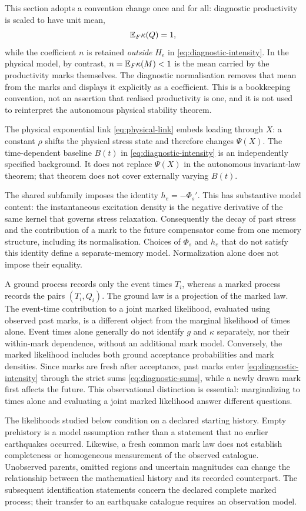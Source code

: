 This section adopts a convention change once and for all: diagnostic productivity is scaled to have unit mean,
\[
\mathbb{E} _F\kappa(Q)=1,
\]
while the coefficient \(n\) is retained \emph{outside} \(H_e\) in \eqref{eq:diagnostic-intensity}. In the physical model, by contrast, \(n=\mathbb{E} _F\kappa(M)<1\) is the mean carried by the productivity marks themselves. The diagnostic normalisation removes that mean from the marks and displays it explicitly as a coefficient. This is a bookkeeping convention, not an assertion that realised productivity is one, and it is not used to reinterpret the autonomous physical stability theorem.

The physical exponential link \eqref{eq:physical-link} embeds loading through \(X\): a constant \(\rho\) shifts the physical stress state and therefore changes \(\Psi(X)\). The time-dependent baseline \(B(t)\) in \eqref{eq:diagnostic-intensity} is an independently specified background. It does not replace \(\Psi(X)\) in the autonomous invariant-law theorem; that theorem does not cover externally varying \(B(t)\).

The shared subfamily imposes the identity \(h_e=-\Phi_s'\). This has substantive model content: the instantaneous excitation density is the negative derivative of the same kernel that governs stress relaxation. Consequently the decay of past stress and the contribution of a mark to the future compensator come from one memory structure, including its normalisation. Choices of \(\Phi_s\) and \(h_e\) that do not satisfy this identity define a separate-memory model. Normalization alone does not impose their equality.

A ground process records only the event times \(T_i\), whereas a marked process records the pairs \((T_i,Q_i)\). The ground law is a projection of the marked law. The event-time contribution to a joint marked likelihood, evaluated using observed past marks, is a different object from the marginal likelihood of times alone. Event times alone generally do not identify \(g\) and \(\kappa\) separately, nor their within-mark dependence, without an additional mark model. Conversely, the marked likelihood includes both ground acceptance probabilities and mark densities. Since marks are fresh after acceptance, past marks enter \eqref{eq:diagnostic-intensity} through the strict sums \eqref{eq:diagnostic-sums}, while a newly drawn mark first affects the future. This observational distinction is essential: marginalizing to times alone and evaluating a joint marked likelihood answer different questions.



The likelihoods studied below condition on a declared starting history. Empty prehistory is a model assumption rather than a statement that no earlier earthquakes occurred. Likewise, a fresh common mark law does not establish completeness or homogeneous measurement of the observed catalogue. Unobserved parents, omitted regions and uncertain magnitudes can change the relationship between the mathematical history and its recorded counterpart. The subsequent identification statements concern the declared complete marked process; their transfer to an earthquake catalogue requires an observation model.
